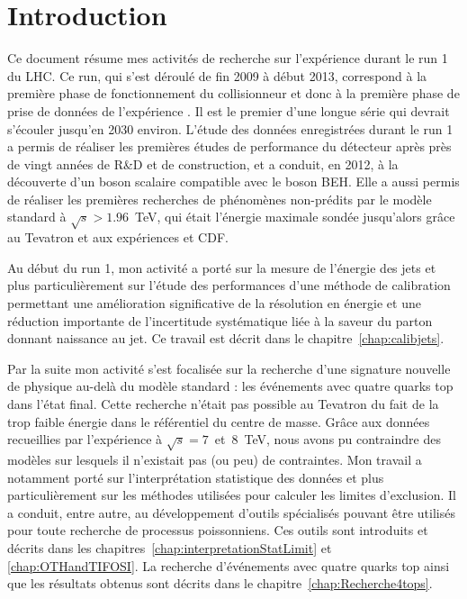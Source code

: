 \chapter*{Introduction}

Ce document r\'esume mes activit\'es de recherche sur l'exp\'erience \ATLAS{} durant le run 1 du LHC. 
Ce run, qui s'est d\'eroul\'e de fin 2009 \`a d\'ebut 2013, correspond \`a la premi\`ere phase de fonctionnement du collisionneur et donc \`a la premi\`ere phase de prise de donn\'ees de l'exp\'erience \ATLAS. 
Il est le premier d'une longue s\'erie qui devrait s'\'ecouler jusqu'en 2030 environ. 
L'\'etude des donn\'ees enregistr\'ees durant le run 1 a permis de r\'ealiser les premi\`eres \'etudes de performance du d\'etecteur apr\`es pr\`es de vingt ann\'ees de R\&D et de construction, 
et a conduit, en 2012, \`a la d\'ecouverte d'un boson scalaire compatible avec le boson BEH. 
Elle a aussi permis  
de r\'ealiser les premi\`eres recherches de ph\'enom\`enes non-pr\'edits par le mod\`ele standard \`a $\sqrt{s}>1.96$~TeV, qui était l'\'energie maximale sond\'ee jusqu'alors gr\^ace au Tevatron et aux exp\'eriences \Dzero et CDF.

Au d\'ebut du run 1, mon activit\'e a port\'e sur la mesure de l'\'energie des jets et plus particuli\`erement sur l'\'etude des performances d'une m\'ethode de calibration permettant %
une am\'elioration significative de la r\'esolution en \'energie et une r\'eduction importante de l'incertitude syst\'ematique li\'ee \`a la saveur du parton donnant naissance au jet. Ce travail est d\'ecrit dans le chapitre~\ref{chap:calibjets}.

Par la suite mon activit\'e s'est focalis\'ee sur la recherche d'une signature nouvelle de physique au-del\`a du mod\`ele standard : les \'ev\'enements avec quatre quarks top dans l'\'etat final. 
Cette recherche 
n'\'etait pas possible au Tevatron du fait de la trop faible \'energie dans le r\'ef\'erentiel du centre de masse. Gr\^ace aux donn\'ees recueillies par l'exp\'erience \ATLAS{} \`a $\sqrt{s}=7$~et~$8$~TeV, 
nous avons 
pu contraindre des mod\`eles sur lesquels il n'existait pas (ou peu) de contraintes. 
Mon travail a notamment port\'e sur l'interpr\'etation statistique des donn\'ees et plus particuli\`erement sur les m\'ethodes utilis\'ees pour calculer les limites d'exclusion. 
Il a conduit, entre autre, au d\'eveloppement d'outils sp\'ecialis\'es pouvant \^etre utilis\'es pour toute recherche de processus poissonniens. Ces outils sont introduits et d\'ecrits dans les chapitres~\ref{chap:interpretationStatLimit} et \ref{chap:OTHandTIFOSI}. La recherche d'\'ev\'enements avec quatre quarks top ainsi que les r\'esultats obtenus sont d\'ecrits dans le chapitre~\ref{chap:Recherche4tops}.

